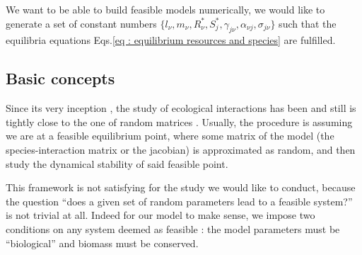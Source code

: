 \documentclass[12pt, titlepage]{report}
\begin{document}
We want to be able to build feasible models numerically, \ie we would like to generate a set of constant numbers $\{
l_\nu, m_\nu, R^*_\nu, S^*_j, \gamma_{j\nu}, \alpha_{\nu j}, \sigma_{j\nu}\}$ such that the equilibria equations Eqs.\eqref{eq : equilibrium resources and species} are fulfilled.


\subsection{Basic concepts}\label{sec : methods feasibility basic concepts}
Since its very inception \cite{may_will_1972}, the study of ecological interactions has been and still is tightly close to the one of random matrices \cite{allesina_stability_2012, allesina_predicting_2015, barbier_cavity_2017}. Usually, the procedure is assuming we are at a feasible equilibrium point, where some matrix of the model (\eg the species-interaction matrix or the jacobian) is approximated as random, and then study the dynamical stability of said feasible point.

This framework is not satisfying for the study we would like to conduct, because the question ``does a given set of random parameters lead to a feasible system?'' is not trivial at all. Indeed for our model to make sense, we impose two conditions on any system deemed as feasible : the model parameters must be ``biological'' and biomass must be conserved.
\end{document}
